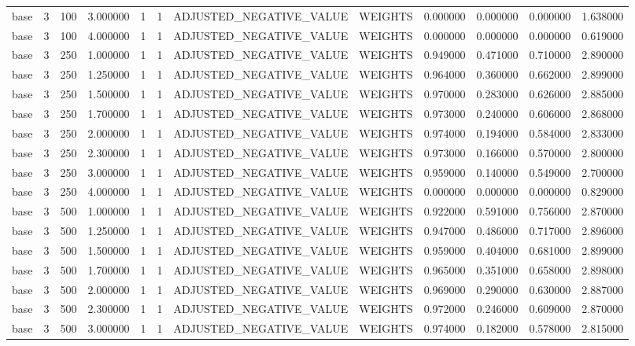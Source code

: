 \begin{tabular}{lrrrllllrrrr}
base & 3 & 100 & 3.000000 & 1 & 1 & ADJUSTED_NEGATIVE_VALUE & WEIGHTS & 0.000000 & 0.000000 & 0.000000 & 1.638000 \\
base & 3 & 100 & 4.000000 & 1 & 1 & ADJUSTED_NEGATIVE_VALUE & WEIGHTS & 0.000000 & 0.000000 & 0.000000 & 0.619000 \\
base & 3 & 250 & 1.000000 & 1 & 1 & ADJUSTED_NEGATIVE_VALUE & WEIGHTS & 0.949000 & 0.471000 & 0.710000 & 2.890000 \\
base & 3 & 250 & 1.250000 & 1 & 1 & ADJUSTED_NEGATIVE_VALUE & WEIGHTS & 0.964000 & 0.360000 & 0.662000 & 2.899000 \\
base & 3 & 250 & 1.500000 & 1 & 1 & ADJUSTED_NEGATIVE_VALUE & WEIGHTS & 0.970000 & 0.283000 & 0.626000 & 2.885000 \\
base & 3 & 250 & 1.700000 & 1 & 1 & ADJUSTED_NEGATIVE_VALUE & WEIGHTS & 0.973000 & 0.240000 & 0.606000 & 2.868000 \\
base & 3 & 250 & 2.000000 & 1 & 1 & ADJUSTED_NEGATIVE_VALUE & WEIGHTS & 0.974000 & 0.194000 & 0.584000 & 2.833000 \\
base & 3 & 250 & 2.300000 & 1 & 1 & ADJUSTED_NEGATIVE_VALUE & WEIGHTS & 0.973000 & 0.166000 & 0.570000 & 2.800000 \\
base & 3 & 250 & 3.000000 & 1 & 1 & ADJUSTED_NEGATIVE_VALUE & WEIGHTS & 0.959000 & 0.140000 & 0.549000 & 2.700000 \\
base & 3 & 250 & 4.000000 & 1 & 1 & ADJUSTED_NEGATIVE_VALUE & WEIGHTS & 0.000000 & 0.000000 & 0.000000 & 0.829000 \\
base & 3 & 500 & 1.000000 & 1 & 1 & ADJUSTED_NEGATIVE_VALUE & WEIGHTS & 0.922000 & 0.591000 & 0.756000 & 2.870000 \\
base & 3 & 500 & 1.250000 & 1 & 1 & ADJUSTED_NEGATIVE_VALUE & WEIGHTS & 0.947000 & 0.486000 & 0.717000 & 2.896000 \\
base & 3 & 500 & 1.500000 & 1 & 1 & ADJUSTED_NEGATIVE_VALUE & WEIGHTS & 0.959000 & 0.404000 & 0.681000 & 2.899000 \\
base & 3 & 500 & 1.700000 & 1 & 1 & ADJUSTED_NEGATIVE_VALUE & WEIGHTS & 0.965000 & 0.351000 & 0.658000 & 2.898000 \\
base & 3 & 500 & 2.000000 & 1 & 1 & ADJUSTED_NEGATIVE_VALUE & WEIGHTS & 0.969000 & 0.290000 & 0.630000 & 2.887000 \\
base & 3 & 500 & 2.300000 & 1 & 1 & ADJUSTED_NEGATIVE_VALUE & WEIGHTS & 0.972000 & 0.246000 & 0.609000 & 2.870000 \\
base & 3 & 500 & 3.000000 & 1 & 1 & ADJUSTED_NEGATIVE_VALUE & WEIGHTS & 0.974000 & 0.182000 & 0.578000 & 2.815000 \\

\end{tabular}
